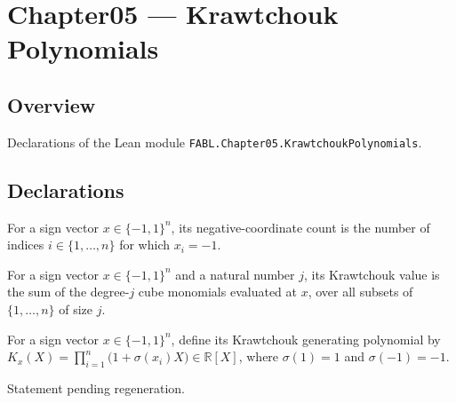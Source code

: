 \chapter{Chapter05 — Krawtchouk Polynomials}
\section{Overview}

Declarations of the Lean module \texttt{FABL.Chapter05.KrawtchoukPolynomials}.

\section{Declarations}

\begin{definition}
\label{FABL.negativeCoordinateCount}
\leanok
For a sign vector $x\in\{-1,1\}^n$, its negative-coordinate count is the number of
indices $i\in\{1,\ldots,n\}$ for which $x_i=-1$.
\end{definition}

\begin{definition}
\label{FABL.krawtchoukValue}
\leanok
{}
For a sign vector $x\in\{-1,1\}^n$ and a natural number $j$, its Krawtchouk value is the
sum of the degree-$j$ cube monomials evaluated at $x$, over all subsets of
$\{1,\ldots,n\}$ of size $j$.
\end{definition}

\begin{definition}
\label{FABL.krawtchoukGeneratingPolynomial}
\leanok
{}
For a sign vector $x\in\{-1,1\}^{n}$, define its Krawtchouk generating polynomial by
$K_x(X)=\prod_{i=1}^{n}\bigl(1+\sigma(x_i)X\bigr)\in\mathbb{R}[X]$, where $\sigma(1)=1$
and $\sigma(-1)=-1$.
\end{definition}

\begin{theorem}
\label{FABL.krawtchoukGeneratingPolynomial_eq_subset_sum}
\leanok
{}
Statement pending regeneration.
\end{theorem}

